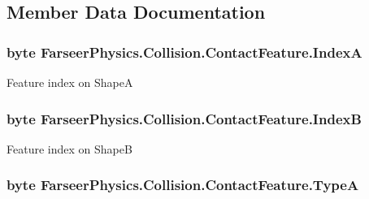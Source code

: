 \subsection{Member Data Documentation}
\hypertarget{struct_farseer_physics_1_1_collision_1_1_contact_feature_a78a2275506344a677783d3e4bc8883f9}{
\subsubsection[{Index\+A}]{\setlength{\rightskip}{0pt plus 5cm}byte Farseer\+Physics.\+Collision.\+Contact\+Feature.\+Index\+A}}\label{struct_farseer_physics_1_1_collision_1_1_contact_feature_a78a2275506344a677783d3e4bc8883f9}


Feature index on Shape\+A 

\hypertarget{struct_farseer_physics_1_1_collision_1_1_contact_feature_aa852c5cf1a63b2a34e06e739f817e843}{
\subsubsection[{Index\+B}]{\setlength{\rightskip}{0pt plus 5cm}byte Farseer\+Physics.\+Collision.\+Contact\+Feature.\+Index\+B}}\label{struct_farseer_physics_1_1_collision_1_1_contact_feature_aa852c5cf1a63b2a34e06e739f817e843}


Feature index on Shape\+B 

\hypertarget{struct_farseer_physics_1_1_collision_1_1_contact_feature_a4a06d6049831cf29449d3e280ff9b853}{
\subsubsection[{Type\+A}]{\setlength{\rightskip}{0pt plus 5cm}byte Farseer\+Physics.\+Collision.\+Contact\+Feature.\+Type\+A}}\label{struct_farseer_physics_1_1_collision_1_1_contact_feature_a4a06d6049831cf29449d3e280ff9b853}


